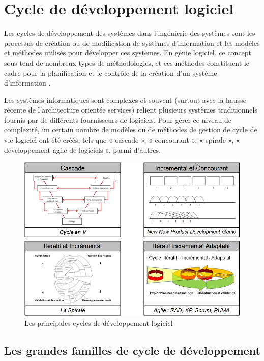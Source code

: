 \section{Cycle de développement logiciel}

Les cycles de développement des systèmes dans l'ingénierie des systèmes sont les processus de création ou de modification de systèmes d'information et les modèles et méthodes utilisés pour développer ces systèmes. En génie logiciel, ce concept sous-tend de nombreux types de méthodologies, et ces méthodes constituent le cadre pour la planification et le contrôle de la création d'un système d'information \cite{cycle}.

Les systèmes informatiques sont complexes et souvent (surtout avec la hausse récente de l'architecture orientée services) relient plusieurs systèmes traditionnels fournis par de différents fournisseurs de logiciels. Pour gérer ce niveau de complexité, un certain nombre de modèles ou de méthodes de gestion de cycle de vie logiciel ont été créés, tels que « cascade », « concourant », « spirale », « développement agile de logiciels », parmi d'autres.

\begin{figure}[h]
\begin{center}
    \includegraphics[scale=0.4]{img/cycles-basiques}
    \caption{Les principales cycles de développement logiciel}
	\label{cycles-basiques}
\end{center}
\end{figure}

\subsection{Les grandes familles de cycle de développement}

